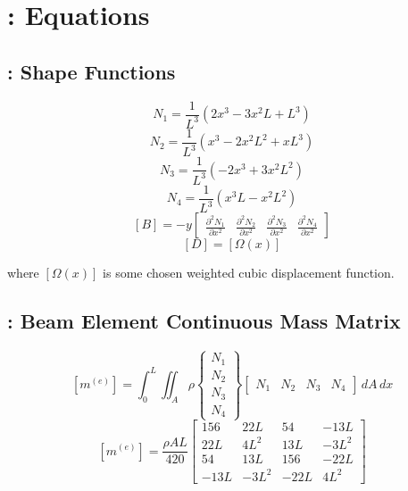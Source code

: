 \documentclass[a4paper, 12pt]{article}
\begin{document}
\section{: Equations}
\subsection{: Shape Functions}
\begin{equation}
N_1 = \frac{1}{L^3} \left( 2x^3 - 3x^2 L + L^3 \right)
\end{equation}
\begin{equation}
N_2 = \frac{1}{L^3} \left( x^3 - 2x^2 L^2 + xL^3 \right)
\end{equation}
\begin{equation}
N_3 = \frac{1}{L^3} \left(-2 x^3 +3x^2 L^2 \right)
\end{equation}
\begin{equation}
N_4 = \frac{1}{L^3} \left( x^3 L - x^2 L^2 \right)
\end{equation}
\begin{equation}
\left[ B \right] = -y \left[
\begin{matrix}
\frac{\partial^2 N_1}{\partial x^2} & \frac{\partial^2 N_2}{\partial x^2} & \frac{\partial^2 N_3}{\partial x^2} & \frac{\partial^2 N_4}{\partial x^2}
\end{matrix}
\right]
\end{equation}
\begin{equation}
\left[ D \right] = \left[ \Omega \left( x \right) \right]
\end{equation}
\begin{center}
where $ \left[ \Omega \left( x \right) \right] $ is some chosen weighted cubic displacement function.
\end{center}
\subsection{: Beam Element Continuous Mass Matrix}
\begin{equation}
\left[ m^{\left( e \right)} \right] = \int_0^L \iint_A \rho \left\{
\begin{matrix}
N_1 \\ N_2 \\ N_3 \\ N_4
\end{matrix} \right\}
\left[
\begin{matrix}
N_1 & N_2 & N_3 & N_4
\end{matrix}
\right] \, dA \, dx
\end{equation}
\begin{equation}
\left[ m^{\left(e\right)} \right] = \frac{\rho A L}{420}
\left[
\begin{matrix}
156&22L&54&-13L\\
22L&4L^2&13L&-3L^2\\
54&13L&156&-22L\\
-13L&-3L^2&-22L&4L^2
\end{matrix}
\right]
\end{equation}
\end{document}
